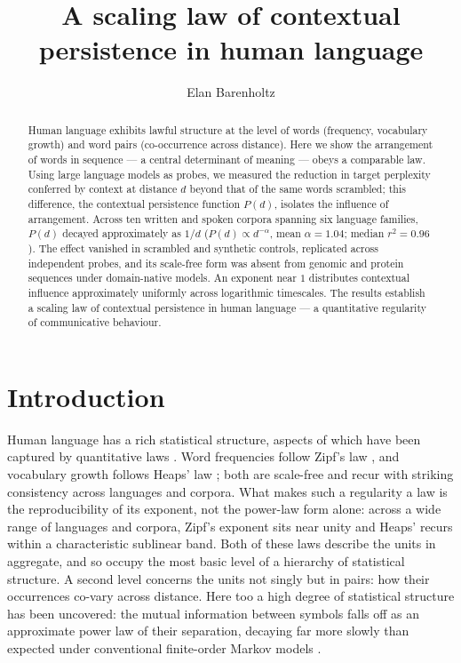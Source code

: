\documentclass[11pt]{article}
\title{\bfseries A scaling law of contextual persistence in human language}
\author[1]{Elan Barenholtz}
\affil[1]{Machine Perception and Cognitive Robotics Laboratory, Department of Psychology and
Center for Complex Systems, Florida Atlantic University}
\date{}
\begin{document}
\maketitle

\begin{abstract}
\noindent
Human language exhibits lawful structure at the level of words (frequency,
vocabulary growth) and word pairs (co-occurrence across distance). Here we show the arrangement of words in
sequence --- a central determinant of meaning --- obeys a comparable law. Using
large language models as probes, we measured the reduction in target perplexity
conferred by context at distance $d$ beyond that of the same words scrambled;
this difference, the contextual persistence function $P(d)$, isolates the influence of
arrangement. Across ten written and spoken corpora spanning six
language families, $P(d)$ decayed approximately as $1/d$
($P(d)\propto d^{-\alpha}$, mean $\alpha=1.04$; median $r^2=0.96$). The effect vanished
in scrambled and synthetic controls, replicated across independent probes, and its scale-free
form was absent from genomic and protein sequences under domain-native models. An exponent near $1$ distributes
contextual influence approximately uniformly across logarithmic timescales. The results
establish a scaling law of contextual persistence in human language --- a quantitative
regularity of communicative behaviour.
\end{abstract}

\section{Introduction}

Human language has a rich statistical structure, aspects of which have been captured by quantitative
laws \citep{altmann2016statistical, tanakaishii2021statistical}. Word frequencies follow Zipf's law \citep{zipf1949human}, and
vocabulary growth follows Heaps' law \citep{heaps1978information}; both are scale-free and recur
with striking consistency across languages and corpora. What makes such a regularity a law is the
reproducibility of its exponent, not the power-law form alone: across a wide range of languages and
corpora, Zipf's exponent sits near unity and Heaps' recurs within a characteristic sublinear band.
Both of these laws describe the units in aggregate, and so occupy
the most basic level of a hierarchy of statistical structure. A second level concerns
the units not singly but in pairs: how their occurrences co-vary across distance. Here too a high
degree of statistical structure has been uncovered: the mutual information
between symbols falls off as an approximate power law of their separation, decaying far more slowly
than expected under conventional finite-order Markov models \citep{ebeling1994entropy, lin2017critical, montemurro2002longrange}.
\end{document}
